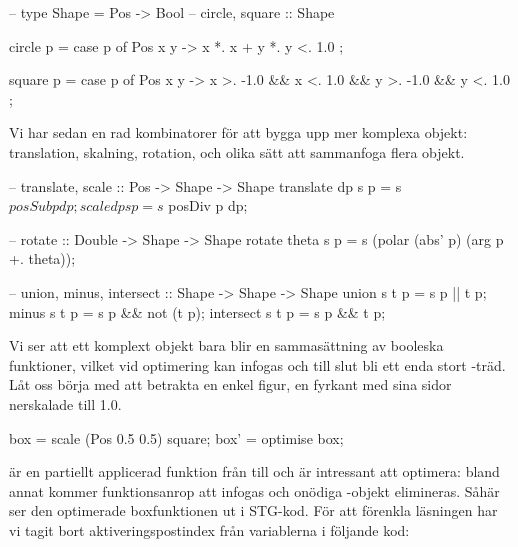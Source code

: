 \documentclass[Rapport]{subfiles}
\begin{document}
\begin{codeEx}
-- type Shape = Pos -> Bool
-- circle, square :: Shape

circle p = case p of
    { Pos x y -> x *. x + y *. y <. 1.0
    };

square p = case p of
    { Pos x y -> x >. -1.0 && x <. 1.0
              && y >. -1.0 && y <. 1.0
    };
\end{codeEx}

Vi har sedan en rad kombinatorer för att bygga upp mer komplexa objekt:
translation, skalning, rotation, och olika sätt att sammanfoga flera objekt.

\begin{codeEx}
-- translate, scale :: Pos -> Shape -> Shape
translate dp s p = s $ posSub p dp;
scale     dp s p = s $ posDiv p dp;

-- rotate :: Double -> Shape -> Shape
rotate theta s p = s (polar (abs' p) (arg p +. theta));

-- union, minus, intersect :: Shape -> Shape -> Shape
union     s t p = s p || t p;
minus     s t p = s p && not (t p);
intersect s t p = s p && t p;
\end{codeEx}

Vi ser att ett komplext objekt bara blir en sammasättning av booleska 
funktioner, vilket vid optimering kan infogas och till slut bli ett enda stort -träd. 
Låt oss börja med att betrakta en enkel figur, en fyrkant med sina sidor
nerskalade till 1.0.

\begin{codeEx}
box  = scale (Pos 0.5 0.5) square;
box' = optimise box;
\end{codeEx}

 är en partiellt applicerad funktion från  till  och
är intressant att optimera: bland annat kommer funktionsanrop att infogas
och onödiga -objekt elimineras.
Såhär ser den optimerade boxfunktionen ut i STG-kod. För att förenkla läsningen har vi tagit bort aktiveringspostindex från variablerna i följande kod:
\end{document}
